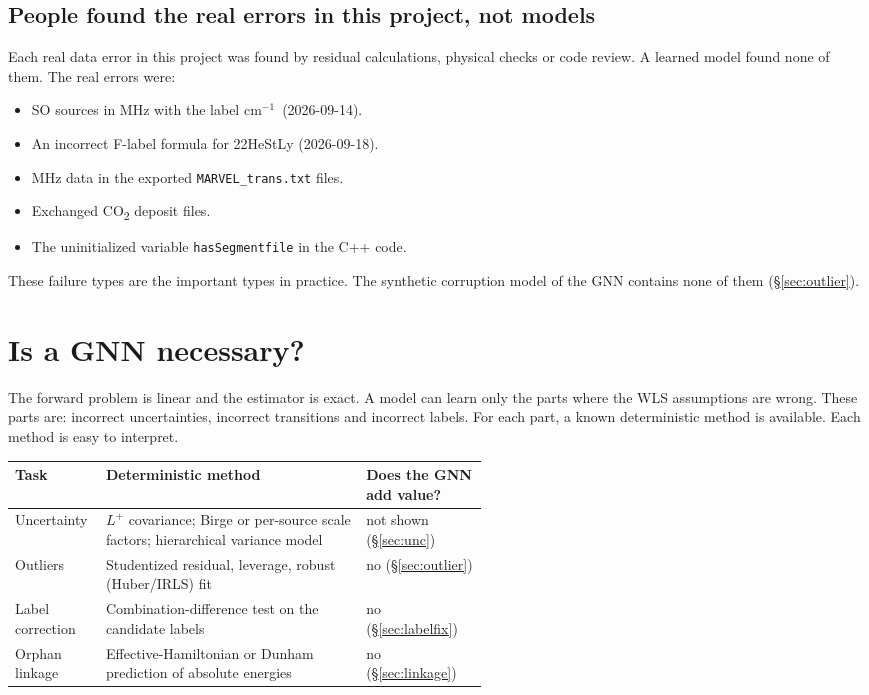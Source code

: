 \documentclass[11pt,a4paper]{article}
\newcommand{\code}[1]{\texttt{#1}}
\newcommand{\cm}{\ensuremath{\mathrm{cm}^{-1}}}
\begin{document}
\subsection{People found the real errors in this project, not models}
Each real data error in this project was found by residual calculations, physical
checks or code review. A learned model found none of them. The real errors were:
\begin{itemize}
\item SO sources in MHz with the label \cm\ (2026-09-14).
\item An incorrect F-label formula for 22HeStLy (2026-09-18).
\item MHz data in the exported \code{MARVEL\_trans.txt} files.
\item Exchanged CO\textsubscript{2} deposit files.
\item The uninitialized variable \code{hasSegmentfile} in the C++ code.
\end{itemize}
These failure types are the important types in practice. The synthetic corruption
model of the GNN contains none of them (\S\ref{sec:outlier}).

\section{Is a GNN necessary?}\label{sec:why}

The forward problem is linear and the estimator is exact. A model can learn only the
parts where the WLS assumptions are wrong. These parts are: incorrect uncertainties,
incorrect transitions and incorrect labels. For each part, a known deterministic
method is available. Each method is easy to interpret.

\begin{center}\small
\begin{tabular}{@{}lp{0.55\linewidth}l@{}}
\toprule
Task & Deterministic method & Does the GNN add value? \\
\midrule
Uncertainty & $L^{+}$ covariance; Birge or per-source scale factors; hierarchical variance model & not shown (\S\ref{sec:unc}) \\
Outliers & Studentized residual, leverage, robust (Huber/IRLS) fit & no (\S\ref{sec:outlier}) \\
Label correction & Combination-difference test on the candidate labels & no (\S\ref{sec:labelfix}) \\
Orphan linkage & Effective-Hamiltonian or Dunham prediction of absolute energies & no (\S\ref{sec:linkage}) \\
\bottomrule
\end{tabular}
\end{center}
\end{document}
